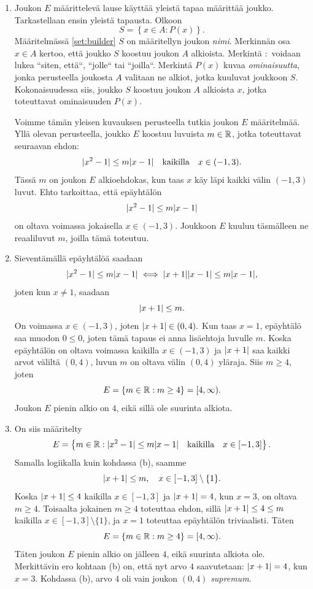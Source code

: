\documentclass[11pt,a4paper]{amsart}
\begin{document}
\begin{solution}
\leavevmode\par
\begin{enumerate}[label=\alph*), nosep]
\item Joukon \(E\) määrittelevä lause käyttää yleistä tapaa määrittää joukko.
Tarkastellaan ensin yleistä tapausta. Olkoon
\begin{equation}\label{set:builder}
S = \left\{x \in A : P(x)\right\}.
\end{equation}
Määritelmässä \ref{set:builder} \(S\) on määritellyn joukon \emph{nimi}.
Merkinnän osa \(x \in A\) kertoo, että joukko \(S\) koostuu joukon \(A\)
alkioista. Merkintä \(:\) voidaan lukea ``siten, että``, ``jolle``
tai ``joilla``. Merkintä \(P(x)\) kuvaa \emph{ominaisuutta},
jonka perusteella joukosta \(A\) valitaan ne alkiot, jotka kuuluvat joukkoon
\(S\). Kokonaisuudessa siis, joukko \(S\) koostuu joukon \(A\) alkioista \(x\),
jotka toteuttavat ominaisuuden \(P(x)\).

Voimme tämän yleisen kuvauksen perusteella tutkia joukon \(E\) määritelmää.
Yllä olevan perusteella, joukko \(E\) koostuu luvuista \(m \in \mathbb{R}\),
jotka toteuttavat seuraavan ehdon:
\[\lvert x^2 - 1\rvert \leq m\lvert x - 1\rvert \quad \text{kaikilla} \quad x \in (-1, 3).\]
Tässä \(m\) on joukon \(E\) alkioehdokas, kun taas \(x\) käy läpi kaikki välin
\((-1, 3)\) luvut. Ehto tarkoittaa, että epäyhtälön
\[\lvert x^2 - 1\rvert \leq m\lvert x - 1\rvert\]
on oltava voimassa jokaisella \(x \in (-1, 3)\). Joukkoon \(E\) kuuluu
täsmälleen ne reaaliluvut \(m\), joilla tämä toteutuu.
\item Sieventämällä epäyhtälöä saadaan
\[\lvert x^2 - 1\rvert \leq m\lvert x - 1\rvert \iff \lvert x + 1\rvert\lvert x - 1\rvert \leq
m\lvert x - 1\rvert,\]
joten kun \(x \neq 1\), saadaan
\[\lvert x + 1\rvert \leq m.\]
On voimassa \(x \in (-1, 3)\), joten \(\lvert x + 1\rvert \in (0, 4).\) Kun taas
\(x = 1\), epäyhtälö saa muodon \(0 \leq 0\), joten tämä tapaus ei anna
lisäehtoja luvulle \(m\).
Koska epäyhtälön on oltava voimassa kaikilla \(x \in (-1,3)\) ja
\(\lvert x + 1\rvert\) saa kaikki arvot väliltä \((0, 4)\), luvun \(m\) on oltava
välin \((0,4)\) yläraja. Siis \(m \ge 4\), joten
\[E=\{m \in \mathbb{R} : m \geq 4\} = [4, \infty).\]
Joukon \(E\) pienin alkio on \(4\), eikä sillä ole suurinta alkiota.
\item On siis määritelty
\[E = \left\{m \in \mathbb{R} : \lvert x^2 - 1\rvert \leq m\lvert x - 1\rvert \quad
\text{kaikilla} \quad x \in [-1, 3] \right\}.\]
Samalla logiikalla kuin kohdassa (b), saamme
\[\lvert x + 1\rvert \leq m, \quad x \in [-1, 3] \setminus{\{1\}}.\]
Koska \(\lvert x + 1\rvert \leq 4\) kaikilla \(x \in [-1, 3]\) ja \(\lvert x + 1\rvert = 4\),
kun \(x = 3\), on oltava \(m \geq 4\). Toisaalta jokainen
\(m \geq 4\) toteuttaa ehdon, sillä \(\lvert x + 1\rvert \leq 4 \leq m\)
kaikilla \(x \in [-1, 3] \setminus{\{1\}}\), ja \(x = 1\) toteuttaa
epäyhtälön triviaalisti. Täten
\[E = \{m \in \mathbb{R} : m \geq 4\} = [4, \infty).\]
Täten joukon \(E\) pienin alkio on jälleen \(4\), eikä suurinta alkiota ole.
Merkittävin ero kohtaan (b) on, että nyt arvo \(4\) saavutetaan:
\(\lvert x + 1\rvert = 4\), kun \(x = 3\). Kohdassa (b), arvo \(4\) oli vain
joukon \((0, 4)\) \emph{supremum}.
\end{enumerate}
\end{solution}
\end{document}
